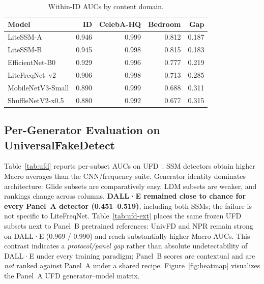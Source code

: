 \begin{table}[H]
\caption{Within-ID AUCs by content domain.\label{tab:domain}}
\scriptsize
\setlength{\tabcolsep}{4pt}
\begin{tabularx}{\textwidth}{@{}P{2.4cm}*{4}{R}@{}}
\toprule
\textbf{Model} & \textbf{ID} & \textbf{CelebA-HQ} & \textbf{Bedroom} & \textbf{Gap} \\
\midrule
LiteSSM-A & 0.946 & 0.999 & 0.812 & 0.187 \\
LiteSSM-B & 0.945 & 0.998 & 0.815 & 0.183 \\
EfficientNet-B0 & 0.929 & 0.996 & 0.777 & 0.219 \\
LiteFreqNet~v2 & 0.906 & 0.998 & 0.713 & 0.285 \\
MobileNetV3-Small & 0.890 & 0.999 & 0.688 & 0.311 \\
ShuffleNetV2-x0.5 & 0.880 & 0.992 & 0.677 & 0.315 \\
\bottomrule
\end{tabularx}
\end{table}

\subsection{Per-Generator Evaluation on UniversalFakeDetect}
\label{sec:ufd}

Table~\ref{tab:ufd} reports per-subset AUCs on UFD~\cite{ojha2023ufd}.
SSM detectors obtain higher Macro averages than the CNN/frequency suite.
Generator identity dominates architecture: Glide subsets are comparatively easy, LDM subsets are weaker, and rankings change across columns.
\textbf{DALL·E remained close to chance for every Panel~A detector (0.451--0.519)}, including both SSMs; the failure is not specific to LiteFreqNet.
Table~\ref{tab:ufd-ext} places the same frozen UFD subsets next to Panel~B pretrained references: UnivFD and NPR remain strong on DALL·E (0.969 / 0.990) and reach substantially higher Macro AUCs.
This contrast indicates a \emph{protocol/panel gap} rather than absolute undetectability of DALL·E under every training paradigm; Panel~B scores are contextual and are \emph{not} ranked against Panel~A under a shared recipe.
Figure~\ref{fig:heatmap} visualizes the Panel~A UFD generator--model matrix.

